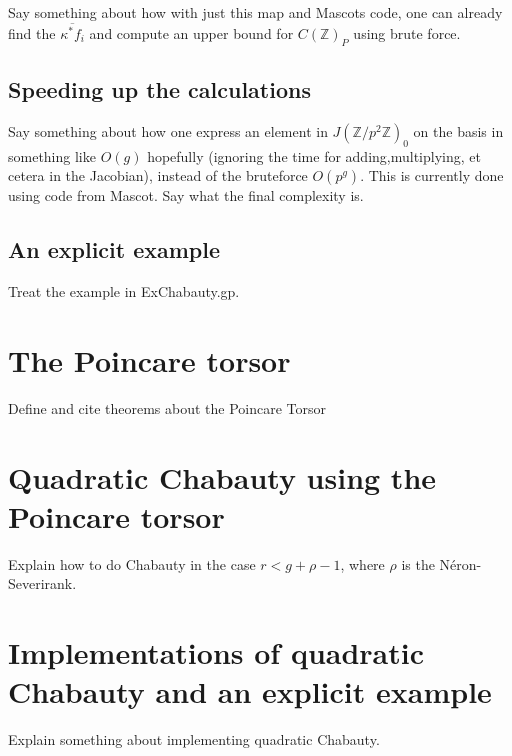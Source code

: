 \documentclass{article}
\newcommand{\Z}{\mathbb{Z}}
\theoremstyle{plain}
\theoremstyle{definition}
\theoremstyle{remark}
\begin{document}
Say something about how with just this map and Mascots code, one can already find the $\overline{\kappa^* f_i} $ and compute an upper bound for $C(\Z)_P$ using brute force.

\subsection{Speeding up the calculations}
Say something about how one express an element in $J(\Z/p^2\Z)_0$ on the basis in something like $O(g)$ hopefully (ignoring the time for adding,multiplying, et cetera in the Jacobian), instead of the bruteforce $O(p^g)$. This is currently done using code from Mascot. Say what the final complexity is.

\subsection{An explicit example}
Treat the example in ExChabauty.gp.

\section{The Poincare torsor}
Define and cite theorems about the Poincare Torsor

\section{Quadratic Chabauty using the Poincare torsor}
Explain how to do Chabauty in the case $r < g + \rho - 1$, where $\rho$ is the N\'eron-Severirank.

\section{Implementations of quadratic Chabauty and an explicit example}
Explain something about implementing quadratic Chabauty.

\newpage


\end{document}
